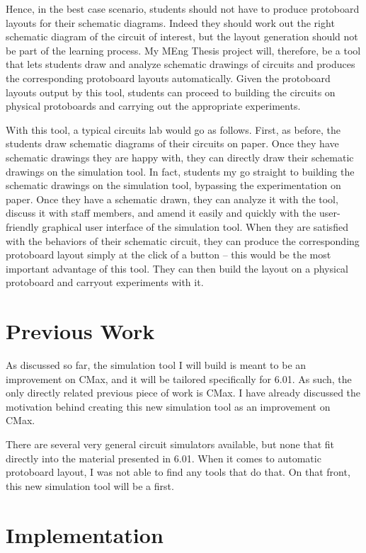 \documentclass[12pt, doublespacing]{amsart}
\begin{document}
Hence, in the best case scenario, students should not have to produce protoboard layouts for their schematic diagrams. Indeed they should work out the right schematic diagram of the circuit of interest, but the layout generation should not be part of the learning process. My MEng Thesis project will, therefore, be a tool that lets students draw and analyze schematic drawings of circuits and produces the corresponding protoboard layouts automatically. Given the protoboard layouts output by this tool, students can proceed to building the circuits on physical protoboards and carrying out the appropriate experiments.

With this tool, a typical circuits lab would go as follows. First, as before, the students draw schematic diagrams of their circuits on paper. Once they have schematic drawings they are happy with, they can directly draw their schematic drawings on the simulation tool. In fact, students my go straight to building the schematic drawings on the simulation tool, bypassing the experimentation on paper. Once they have a schematic drawn, they can analyze it with the tool, discuss it with staff members, and amend it easily and quickly with the user-friendly graphical user interface of the simulation tool. When they are satisfied with the behaviors of their schematic circuit, they can produce the corresponding protoboard layout simply at the click of a button -- this would be the most important advantage of this tool. They can then build the layout on a physical protoboard and carryout experiments with it.

\section{Previous Work}
\label{sec:previouswork}

As discussed so far, the simulation tool I will build is meant to be an improvement on CMax, and it will be tailored specifically for 6.01. As such, the only directly related previous piece of work is CMax. I have already discussed the motivation behind creating this new simulation tool as an improvement on CMax.

There are several very general circuit simulators available, but none that fit directly into the material presented in 6.01. When it comes to automatic protoboard layout, I was not able to find any tools that do that. On that front, this new simulation tool will be a first.

\section{Implementation}
\label{sec:implementation}
\end{document}
